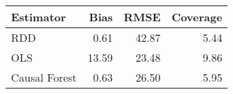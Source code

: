 \begin{table}[ht]
\centering
\begin{tabular}{lrrr}
  \hline
Estimator & Bias & RMSE & Coverage \\ 
  \hline
RDD & 0.61 & 42.87 & 5.44 \\ 
  OLS & 13.59 & 23.48 & 9.86 \\ 
  Causal Forest & 0.63 & 26.50 & 5.95 \\ 
   \hline
\end{tabular}
\caption{} 
\end{table}
